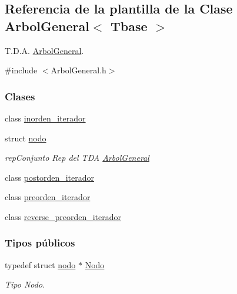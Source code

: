 \hypertarget{classArbolGeneral}{\subsection{Referencia de la plantilla de la Clase Arbol\-General$<$ Tbase $>$}
\label{classArbolGeneral}
}


T.\-D.\-A. \hyperlink{classArbolGeneral}{Arbol\-General}.  




{\ttfamily \#include $<$Arbol\-General.\-h$>$}

\subsubsection*{Clases}
\begin{DoxyCompactItemize}
\item 
class \hyperlink{classArbolGeneral_1_1inorden__iterador}{inorden\-\_\-iterador}
\item 
struct \hyperlink{structArbolGeneral_1_1nodo}{nodo}
\begin{DoxyCompactList}\small\item\em rep\-Conjunto Rep del T\-D\-A \hyperlink{classArbolGeneral}{Arbol\-General} \end{DoxyCompactList}\item 
class \hyperlink{classArbolGeneral_1_1postorden__iterador}{postorden\-\_\-iterador}
\item 
class \hyperlink{classArbolGeneral_1_1preorden__iterador}{preorden\-\_\-iterador}
\item 
class \hyperlink{classArbolGeneral_1_1reverse__preorden__iterador}{reverse\-\_\-preorden\-\_\-iterador}
\end{DoxyCompactItemize}
\subsubsection*{Tipos públicos}
\begin{DoxyCompactItemize}
\item 
typedef struct \hyperlink{structArbolGeneral_1_1nodo}{nodo} $\ast$ \hyperlink{classArbolGeneral_a12cc1b74a9095d89bc7334290d332f7a}{Nodo}
\begin{DoxyCompactList}\small\item\em Tipo Nodo. \end{DoxyCompactList}\end{DoxyCompactItemize}
